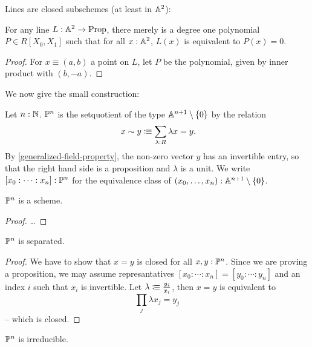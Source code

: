 Lines are closed subschemes (at least in $\mathbb{A}^2$):

\begin{proposition}%
  For any line $L : \mathbb{A}^{2}\to \mathrm{Prop}$, there merely is a degree one polynomial $P\in R[X_0,X_1]$ such that
  for all $x:\mathbb{A}^{2}$, $L(x)$ is equivalent to $P(x)=0$.
\end{proposition}

\begin{proof}
  For $x\equiv(a,b)$ a point on $L$,
  let $P$ be the polynomial, given by inner product with $(b,-a)$. 
\end{proof}

We now give the small construction:

\begin{definition}%
  \label{projective-space-hit}
  Let $n:\mathbb{N}$.
   $\mathbb{P}^n$ is the setquotient of the type $\mathbb{A}^{n+1}\setminus\{0\}$ by the relation
  \[
    x \sim y \colonequiv \sum_{\lambda : R} \lambda x=y\rlap{.}
  \]
  By \cref{generalized-field-property}, the non-zero vector $y$ has an invertible entry,
  so that the right hand side is a proposition and $\lambda$ is a unit.
  We write $[x_0:\dots:x_n]:\mathbb{P}^n$ for the equivalence class of $(x_0,\dots,x_n):\mathbb{A}^{n+1}\setminus\{0\}$.
\end{definition}

\begin{theorem}
  $\mathbb{P}^n$ is a scheme.
\end{theorem}

\begin{proof}
  \dots
\end{proof}

\begin{proposition}
  \label{projective-space-separated}
  $\mathbb{P}^n$ is separated.
\end{proposition}

\begin{proof}
  We have to show that $x=y$ is closed for all $x,y:\mathbb{P}^n$.
  Since we are proving a proposition, we may assume represantatives
  $[x_0:\cdots:x_n]=[y_0:\cdots:y_n]$ and an index $i$ such that $x_i$ is invertible.
  Let $\lambda\vcentcolon\mspace{-1.2mu}\equiv \frac{y_i}{x_i}$, then $x=y$ is equivalent to
  \[
    \prod_j \lambda x_j=y_j
  \]
  -- which is closed.
\end{proof}

\begin{proposition}%
  \label{projective-space-irreducible}
  $\mathbb{P}^n$ is irreducible.
\end{proposition}

